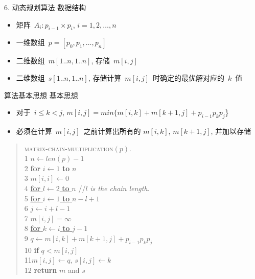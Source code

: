 \documentclass[fontset=fandol,UTF8,fleqn]{beamer}
\begin{document}

\begin{frame}{6. 动态规划算法}
数据结构
  \begin{itemize}[<+-|alert@+>]
\item 矩阵~$A_i: p_{i-1}\times p_i$, $i=1, 2, \ldots, n$  
\item 一维数组~$p=[p_0,p_1,\ldots, p_n]$  
\item 二维数组~$m[1..n, 1..n]$, 存储~$m[i,j]$  
\item 二维数组~$s[1..n,1..n]$, 存储计算~$m[i,j]$~时确定的最优解对应的~$k$~值  
\end{itemize}
\end{frame}

\begin{frame}{算法基本思想}
基本思想
  \begin{itemize}[<+-|alert@+>]
\item 对于~$i \le k < j$, $m[i,j]=min\{m[i,k]+m[k+1,j]+p_{i-1}p_kp_j$\}  
\item 必须在计算~$m[i,j]$~之前计算出所有的 $m[i,k]$, $m[k+1,j]$, 并加以存储  
\end{itemize}
\end{frame}

\begin{frame}{} 
\begin{quote}
\small{
\textsc{matrix-chain-multiplication}$(p)$.\\
1 $n\gets  len(p) -1$\\
2 \textbf{for} $i\gets 1$ \textbf{to} $n$\\
3 \qquad   $m[i, i]\gets  0$\\
4 \underline{\textbf{for} $l\gets 2$ \textbf{to} $n$} //$l$
\textit{is the chain length}.\\
5 \qquad \underline{\textbf{for} $i\gets 1$ \textbf{to} $n-l+1$}\\
6 \qquad \qquad  $j\gets i + l-1$\\
7 \qquad \qquad $m[i,j] = \infty$ \\
8 \qquad \qquad  \underline{\textbf{for} $k\gets i$ \textbf{to} $j-1$}\\
9 \qquad \qquad \qquad $q\gets m[i,k] + m[k + 1,j] +p_{i-1}p_kp_j$\\
10 \qquad \qquad \qquad   \textbf{if} $q < m[i, j]$\\
11\qquad \qquad \qquad  \qquad $m[i, j]\gets  q$, $s[i, j]\gets  k$\\
12 \textbf{return} $m$ and $s$
}
\end{quote}
\end{frame}
\end{document}
